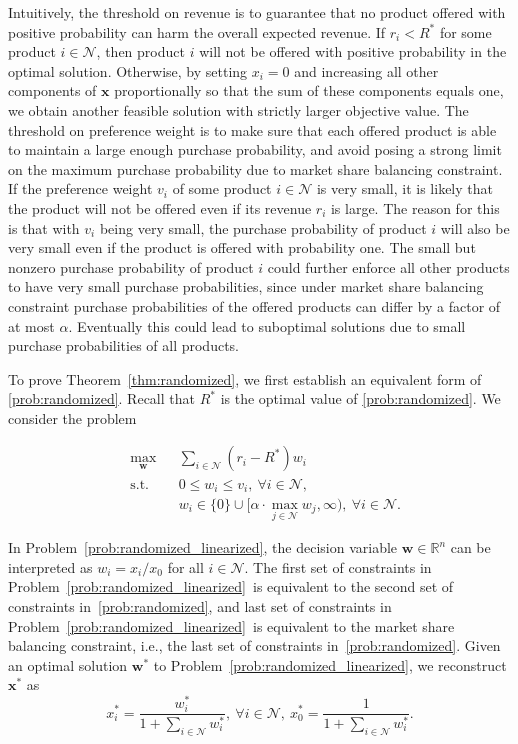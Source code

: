 \documentclass[mnsc,non-blindrev]{informs3}
\theoremstyle{definition}
\begin{document}
Intuitively, the threshold on revenue is to guarantee that no product offered with positive probability can harm the overall expected revenue. If $r_i<R^*$ for some product $i\in\mathcal{N}$, then product $i$ will not be offered with positive probability in the optimal solution. Otherwise, by setting $x_i=0$ and increasing all other components of $\bm{x}$ proportionally so that the sum of these components equals one, we obtain another feasible solution with strictly larger objective value. The threshold on preference weight is to make sure that each offered product is able to maintain a large enough purchase probability, and avoid posing a strong limit on the maximum purchase probability due to market share balancing constraint. If the preference weight $v_i$ of some product $i\in\mathcal{N}$ is very small, it is likely that the product will not be offered even if its revenue $r_i$ is large. The reason for this is that with $v_i$ being very small, the purchase probability of product $i$ will also be very small even if the product is offered with probability one. The small but nonzero purchase probability of product $i$ could further enforce all other products to have very small purchase probabilities, since under market share balancing constraint purchase probabilities of the offered products can differ by a factor of at most $\alpha$. Eventually this could lead to suboptimal solutions due to small purchase probabilities of all products.

To prove Theorem~\ref{thm:randomized}, we first establish an equivalent form of \ref{prob:randomized}. Recall that $R^*$ is the optimal value of \ref{prob:randomized}. We consider the problem

\begin{equation}\label{prob:randomized_linearized}
\begin{aligned}
&\max_{\bm{w}} && \sum_{i\in\mathcal{N}}(r_i-R^*)w_i\\
&\text{s.t.} && 0\leq w_i\leq v_i,\ \forall i\in\mathcal{N},\\
&&& w_i\in\{0\}\cup\Big[\alpha\cdot\max_{j\in\mathcal{N}}w_j,\infty\Big),\ \forall i\in\mathcal{N}.
\end{aligned}
\end{equation}

In Problem~\eqref{prob:randomized_linearized}, the decision variable $\bm{w}\in\mathbb{R}^n$ can be interpreted as $w_i=x_i/x_0$ for all $i\in\mathcal{N}$. The first set of constraints in Problem~\eqref{prob:randomized_linearized}~is equivalent to the second set of constraints in~\ref{prob:randomized}, and last set of constraints in Problem~\eqref{prob:randomized_linearized}~is equivalent to the market share balancing constraint, i.e., the last set of constraints in~\ref{prob:randomized}. Given an optimal solution $\bm{w}^*$ to Problem~\eqref{prob:randomized_linearized}, we reconstruct $\bm{x}^*$ as
\begin{equation}
x_i^*=\dfrac{w_i^*}{1+\sum_{i\in\mathcal{N}}w_i^*},\ \forall i\in\mathcal{N},\ x_0^*=\dfrac{1}{1+\sum_{i\in\mathcal{N}}w_i^*}.\label{eq:reconstruct_x}
\end{equation}
\end{document}
